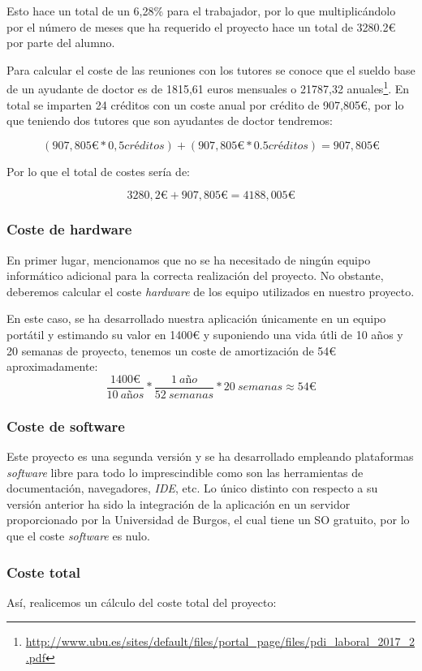 Esto hace un total de un 6,28\% para el trabajador, por lo que multiplicándolo por el número de meses que ha requerido el proyecto hace un total de 3280.2\euro{} por parte del alumno.

Para calcular el coste de las reuniones con los tutores se conoce que el sueldo base de un ayudante de doctor es de 1815,61 euros mensuales o 21787,32 anuales\footnote{\url{http://www.ubu.es/sites/default/files/portal_page/files/pdi_laboral_2017_2.pdf}}. En total se imparten 24 créditos con un coste anual por crédito de 907,805\euro{}, por lo que teniendo dos tutores que son ayudantes de doctor tendremos:

\[ (907,805\euro{} * 0,5 créditos) + (907,805\euro{} * 0.5 créditos) = 907,805\euro{}\]

Por lo que el total de costes sería de:

\[ 3280,2\euro{} + 907,805\euro{} = 4188,005\euro{} \]

\subsubsection{Coste de hardware}
En primer lugar, mencionamos que no se ha necesitado de ningún equipo informático adicional para la correcta realización del proyecto. No obstante, deberemos calcular el coste \textit{hardware} de los equipo utilizados en nuestro proyecto.

En este caso, se ha desarrollado nuestra aplicación únicamente en un equipo portátil y estimando su valor en 1400\euro{} y suponiendo una vida útli de 10 años y 20 semanas de proyecto, tenemos un coste de amortización de 54\euro{} aproximadamente:
\[ \frac{1400\euro}{10 \ a\textit{ñ}os} * \frac{1 \ a\textit{ñ}o}{52 \ semanas} * 20 \ semanas \approx 54\euro \]

\subsubsection{Coste de software}
Este proyecto es una segunda versión y se ha desarrollado empleando plataformas \textit{software} libre para todo lo imprescindible como son las herramientas de documentación, navegadores, \textit{IDE}, etc. Lo único distinto con respecto a su versión anterior ha sido la integración de la aplicación en un servidor proporcionado por la Universidad de Burgos, el cual tiene un SO gratuito, por lo que el coste \textit{software} es nulo.

\subsubsection{Coste total}
Así, realicemos un cálculo del coste total del proyecto:

